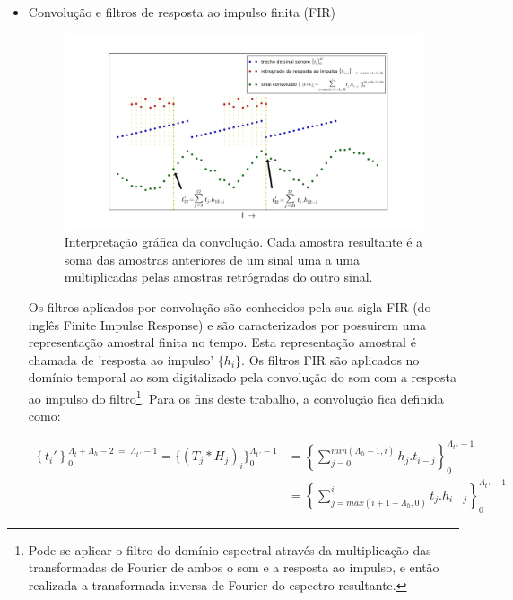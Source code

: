 \begin{itemize}

\item  Convolução e filtros de resposta ao impulso finita (FIR)

\begin{figure}[h!]
    \centering
        \includegraphics[width=\textwidth]{figuras/convolucao______}
    \caption{Interpretação gráfica da convolução. Cada amostra resultante é a soma das amostras anteriores de um sinal uma a uma multiplicadas pelas amostras retrógradas do outro sinal.}
        \label{fig:conv}
\end{figure}

Os filtros aplicados por convolução são conhecidos
pela sua sigla FIR (do inglês Finite Impulse Response)
e são caracterizados por possuirem uma representação amostral
finita no tempo. Esta representação amostral é chamada
de 'resposta ao impulso' $\{h_i\}$. Os filtros FIR são aplicados 
no domínio temporal ao som
digitalizado pela convolução do som com a 
resposta ao impulso do filtro\footnote{Pode-se aplicar o filtro do domínio espectral através da multiplicação das transformadas de Fourier de ambos o som e a resposta ao impulso, e então realizada a transformada inversa de Fourier do espectro resultante.\cite{Openheim}}. Para os fins deste trabalho, a
convolução fica definida como:

\begin{equation}\label{eq:conv}
\begin{split}
\left\{t_i'\right\}_0^{\Lambda_t+\Lambda_h-2\; = \;\Lambda_{t\, '}-1} =\{(T_j*H_j)_i\}_0^{\Lambda_{t \, '}-1} & =\left \{ \sum_{j=0}^{min(\Lambda_h-1,i)}h_{j} . t_{i-j} \right \}_0^{\Lambda_{t\, '}-1} \\
    & =\left \{ \sum_{j=max(i+1-\Lambda_h,0)}^{i}t_j . h_{i-j} \right \}_0^{\Lambda_{t\, '}-1}
\end{split}
\end{equation}


\end{itemize}
